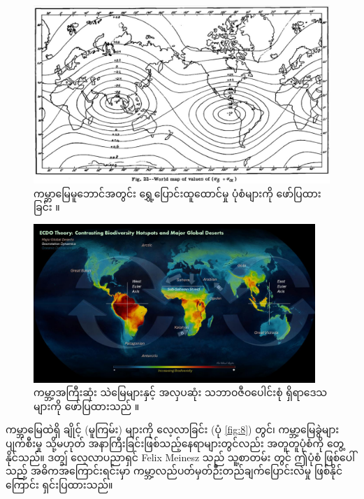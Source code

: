 \documentclass[10pt,twocolumn,letterpaper]{article}
\begin{document}
\begin{figure}[t]
\begin{center}
   \includegraphics[width=1\linewidth]{meinesz3.jpg}
\end{center}
   \caption{ကမ္ဘာမြေမူဘောင်အတွင်း ရွှေ့ပြောင်းထူထောင်မှု ပုံစံများကို ဖော်ပြထားခြင်း \cite{36}။}
\label{fig:8}
\label{fig:onecol}
\end{figure}

\begin{figure}[t]
\begin{center}
\includegraphics[width=0.95\textwidth]{biodiversity.jpg}
\end{center}
   \caption{ကမ္ဘာ့အကြီးဆုံး သဲမြေများနှင့် အလှပဆုံး သဘာဝဇီဝပေါင်းစုံ ရှိရာဒေသများကို ဖော်ပြထားသည် \cite{28}။}
\label{fig:9}
\end{figure}

ကမ္ဘာမြေထဲရှိ ချိုင့် (မူကြမ်း) များကို လေ့လာခြင်း (ပုံ \ref{fig:8}) တွင်၊ ကမ္ဘာ့မြေခွဲများ ပျက်စီးမှု သို့မဟုတ် အနာကြီးခြင်းဖြစ်သည့်နေရာများတွင်လည်း အတူတူပုံစံကို တွေ့နိုင်သည်။ ဒတ္ချ် လေ့လာပညာရှင် Felix Meinesz သည် သူ့စာတမ်း \cite{36} တွင် ဤပုံစံ ဖြစ်ပေါ်သည့် အဓိကအကြောင်းရင်းမှာ ကမ္ဘာ့လည်ပတ်မှတ်ဉီးတည်ချက်ပြောင်းလဲမှု ဖြစ်နိုင်ကြောင်း ရှင်းပြထားသည်။
\end{document}
